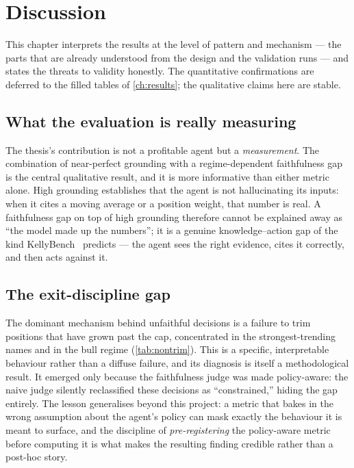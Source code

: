 \chapter{Discussion}
\label{ch:discussion}

This chapter interprets the results at the level of pattern and mechanism --- the parts that
are already understood from the design and the validation runs --- and states the threats to
validity honestly. The quantitative confirmations are deferred to the filled tables of
\cref{ch:results}; the qualitative claims here are stable.

\section{What the evaluation is really measuring}

The thesis's contribution is not a profitable agent but a \emph{measurement}. The combination
of near-perfect grounding with a regime-dependent faithfulness gap is the central qualitative
result, and it is more informative than either metric alone. High grounding establishes that
the agent is not hallucinating its inputs: when it cites a moving average or a position
weight, that number is real. A faithfulness gap on top of high grounding therefore cannot be
explained away as ``the model made up the numbers''; it is a genuine knowledge--action gap of
the kind KellyBench~\cite{kellybench2026} predicts --- the agent sees the right evidence,
cites it correctly, and then acts against it.

\section{The exit-discipline gap}

The dominant mechanism behind unfaithful decisions is a failure to trim positions that have
grown past the cap, concentrated in the strongest-trending names and in the bull regime
(\cref{tab:nontrim}). This is a specific, interpretable behaviour rather than a diffuse failure,
and its diagnosis is itself a methodological result. It emerged only because the faithfulness
judge was made policy-aware: the naive judge silently reclassified these decisions as
``constrained,'' hiding the gap entirely. The lesson generalises beyond this project: a metric
that bakes in the wrong assumption about the agent's policy can mask exactly the behaviour it
is meant to surface, and the discipline of \emph{pre-registering} the policy-aware metric
before computing it is what makes the resulting finding credible rather than a post-hoc story.

